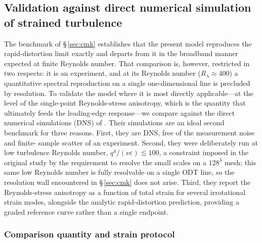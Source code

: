 \documentclass[lineno]{JFM-FLM_Au}
\begin{document}
\subsection{Validation against direct numerical simulation of strained
turbulence}
\label{sec:lr-validation}

The benchmark of \S\,\ref{sec:cmk} establishes that the present model reproduces
the rapid-distortion limit exactly and departs from it in the broadband manner
expected at finite Reynolds number. That comparison is, however, restricted in
two respects: it is an experiment, and at its Reynolds number
($R_\lambda\approx400$) a quantitative spectral reproduction on a single
one-dimensional line is precluded by resolution. To validate the model where it
is most directly applicable---at the level of the single-point Reynolds-stress
anisotropy, which is the quantity that ultimately feeds the leading-edge
response---we compare against the direct numerical simulations (DNS) of
\citet{LeeReynolds1985}. Their simulations are an ideal second benchmark for
three reasons. First, they are DNS, free of the measurement noise and finite-%
sample scatter of an experiment. Second, they were deliberately run at low
turbulence Reynolds number, $q^4/(\nu\varepsilon)\lesssim100$, a constraint
imposed in the original study by the requirement to resolve the small scales on
a $128^3$ mesh; this same low Reynolds number is fully resolvable on a single
ODT line, so the resolution wall encountered in \S\,\ref{sec:cmk} does not arise.
Third, they report the Reynolds-stress anisotropy as a function of total strain
for several irrotational strain modes, alongside the analytic rapid-distortion
prediction, providing a graded reference curve rather than a single endpoint.

\subsubsection{Comparison quantity and strain protocol}
\label{sec:lr-quantity}
\end{document}
